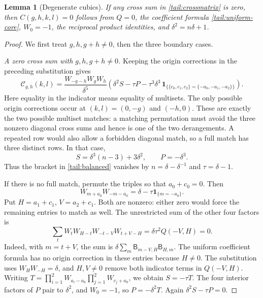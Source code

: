 \documentclass[11pt]{article}
\numberwithin{equation}{section}
\newtheorem{lemma}[theorem]{Lemma}
\theoremstyle{definition}
\theoremstyle{remark}
\newcommand{\ind}[1]{\mathbf1_{\{#1\}}}
\begin{document}
\begin{lemma}[Degenerate cubics]\label{tail:collisions}
If any cross sum in \eqref{tail:crossmatrix} is zero, then
$C(g,h,k,l)=0$ follows from $Q=0$, the coefficient formula
\eqref{tail:uniform-core}, $W_0=-1$, the reciprocal product identities,
and $\delta^2=n\delta+1$.
\end{lemma}

\begin{proof}
We first treat $g,h,g+h\ne0$, then the three boundary cases.

\emph{A zero cross sum with $g,h,g+h\ne0$.}
Keeping the origin corrections in the preceding substitution gives
\begin{equation}\label{tail:balanced}
 \mathcal C_{g,h}(k,l)
 =\frac{W_{-g-h}W_gW_h}{\delta^5}
 \left(\delta^2S-\tau P-\tau^3\delta^3\,
 \ind{\{c_0,c_1,c_2\}=\{-a_0,-a_1,-a_2\}}\right).
\end{equation}
Here equality in the indicator means equality of multisets.
The only possible origin corrections occur at
$(k,l)=(0,-g)$ and $(-h,0)$. These are exactly the two possible
multiset matches: a matching permutation must avoid the three
nonzero diagonal cross sums and hence is one of the two derangements.
A repeated row would also allow a forbidden diagonal match, so a full
match has three distinct rows. In that case,
\[
 S=\delta^3(n-3)+3\delta^2,\qquad P=-\delta^3.
\]
Thus the bracket in \eqref{tail:balanced} vanishes by
$n=\delta-\delta^{-1}$ and $\tau=\delta-1$.

If there is no full match, permute the triples so that $a_0+c_0=0$.
Then
\[
 W_{m+a_0}W_{-m-a_0}=\delta-\tau\ind{m=-a_0}.
\]
Put $H=a_1+c_1$, $V=a_2+c_1$. Both are nonzero: either zero
would force the remaining entries to match as well. The unrestricted
sum of the other four factors is
\[
\sum_tW_tW_{H-t}W_{-t-V}W_{t+V-H}
       =\delta\tau^2Q(-V,H)=0.
\]
Indeed, with $m=t+V$, the sum is
$\delta\sum_m\mathsf B_{m-V,H}\mathsf B_{H,m}$.
The uniform coefficient formula has no origin correction in these
entries because $H\ne0$. The substitution uses
$W_HW_{-H}=\delta$, and $H,V\ne0$ remove both indicator terms
in $Q(-V,H)$.
Writing
$T=\prod_{i=1}^2W_{a_i-a_0}\prod_{j=1}^2W_{c_j+a_0}$,
we obtain $S=-\tau T$. The four interior factors of $P$ pair
to $\delta^2$, and $W_0=-1$, so $P=-\delta^2T$.
Again $\delta^2S-\tau P=0$.


\end{proof}
\end{document}
